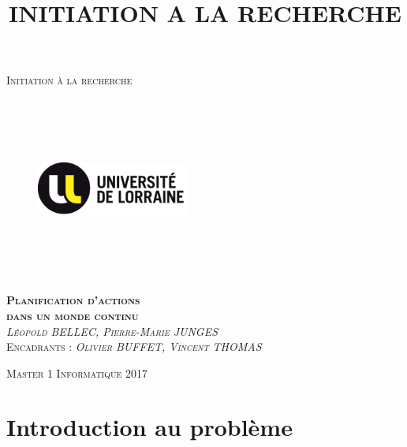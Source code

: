 \documentclass[pdftex,french, english]{article}	%
\begin{document}

\title{INITIATION A LA RECHERCHE}

\begin{titlepage}
\begin{center}

\textsc{\Large Initiation à la recherche}\\[4em]

\begin{figure}[h]
\begin{center}
\includegraphics[width=5cm,height=6cm,keepaspectratio]{lorraine.png}
\end{center}
\end{figure}

\vspace{4em}
\textsc{\Large \textbf{Planification d'actions \\ dans un monde continu}}\\[10em]
\textsc{\textit{Léopold BELLEC, Pierre-Marie JUNGES}}\\[1em]
\vspace{1em}
\textsc{Encadrants : \textit{Olivier BUFFET, Vincent THOMAS}}\\[1em]


\end{center}

\vspace*{\fill}
\textsc{Master 1 Informatique \hspace*{\fill} 2017}

\end{titlepage}

\newpage
{}

\tableofcontents


\newpage
{}
\section{Introduction au problème}
\end{document}
